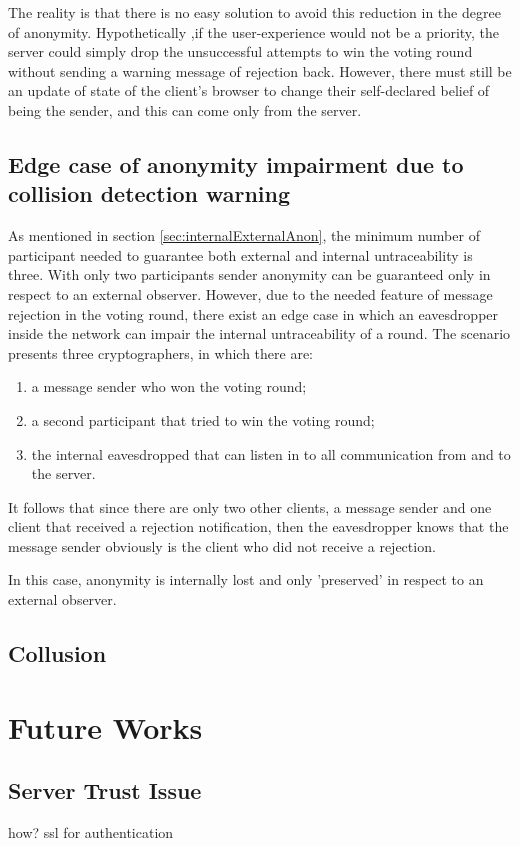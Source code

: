 The reality is that there is no easy solution to avoid this reduction in the degree of anonymity. Hypothetically ,if the user-experience would not be a priority, the server could simply drop the unsuccessful attempts to win the voting round without sending a warning message of rejection back. However, there must still be an update of state of the client's browser to change their self-declared belief of being the sender, and this can come only from the server.

\subsection{Edge case of anonymity impairment due to collision detection warning}
As mentioned in section \ref{sec:internalExternalAnon}, the minimum number of participant needed to guarantee both external and internal untraceability is three. With only two participants sender anonymity can be guaranteed only in respect to an external observer. However, due to the needed feature of message rejection in the voting round, there exist an edge case in which an eavesdropper inside the network can impair the internal untraceability of a round. The scenario presents three cryptographers, in which there are:
\begin{enumerate}
    \item a message sender who won the voting round;
    \item a second participant that tried to win the voting round;
    \item the internal eavesdropped that can listen in to all communication from and to the server.
\end{enumerate}
It follows that since there are only two other clients, a message sender and one client that received a rejection notification, then the eavesdropper knows that the message sender obviously is the client who did not receive a rejection.


In this case, anonymity is internally lost and only 'preserved' in respect to an external observer.


\subsection{Collusion}


\section{Future Works}

\subsection{Server Trust Issue}
how? ssl for authentication


